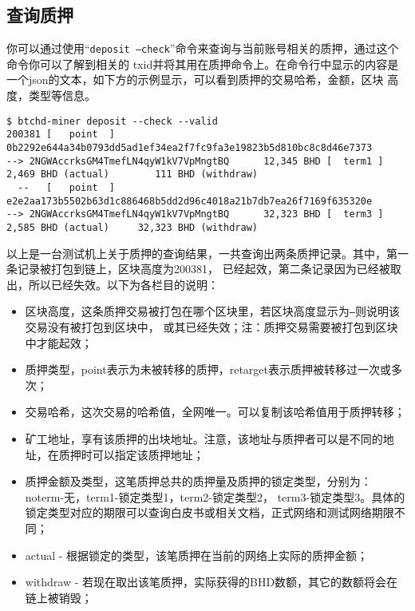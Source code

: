 \begin{flushleft}
\subsection{查询质押}
\begin{flushleft}
    你可以通过使用``\texttt{deposit --check}''命令来查询与当前账号相关的质押，通过这个命令你可以了解到相关的
    txid并将其用在质押命令上。在命令行中显示的内容是一个json的文本，如下方的示例显示，可以看到质押的交易哈希，金额，区块
    高度，类型等信息。
\end{flushleft}
\scriptsize
\begin{verbatim}
$ btchd-miner deposit --check --valid
200381 [   point  ] 0b2292e644a34b0793dd5ad1ef34ea2f7fc9fa3e19823b5d810bc8c8d46e7373
--> 2NGWAccrksGM4TmefLN4qyW1kV7VpMngtBQ      12,345 BHD [  term1 ]
2,469 BHD (actual)        111 BHD (withdraw)
  --   [   point  ] e2e2aa173b5502b63d1c886468b5dd2d96c4018a21b7db7ea26f7169f635320e
--> 2NGWAccrksGM4TmefLN4qyW1kV7VpMngtBQ      32,323 BHD [  term3 ]
2,585 BHD (actual)     32,323 BHD (withdraw)
\end{verbatim}
\normalsize
\begin{flushleft}
    以上是一台测试机上关于质押的查询结果，一共查询出两条质押记录。其中，第一条记录被打包到链上，区块高度为200381，
    已经起效，第二条记录因为已经被取出，所以已经失效。以下为各栏目的说明：
\end{flushleft}
\begin{itemize}
    \item 区块高度，这条质押交易被打包在哪个区块里，若区块高度显示为\texttt{---}则说明该交易没有被打包到区块中，
        或其已经失效；注：质押交易需要被打包到区块中才能起效；
    \item 质押类型，point表示为未被转移的质押，retarget表示质押被转移过一次或多次；
    \item 交易哈希，这次交易的哈希值，全网唯一。可以复制该哈希值用于质押转移；
    \item 矿工地址，享有该质押的出块地址。注意，该地址与质押者可以是不同的地址，在质押时可以指定该质押地址；
    \item 质押金额及类型，这笔质押总共的质押量及质押的锁定类型，分别为：noterm-无，term1-锁定类型1，term2-锁定类型2，
        term3-锁定类型3。具体的锁定类型对应的期限可以查询白皮书或相关文档，正式网络和测试网络期限不同；
    \item actual - 根据锁定的类型，该笔质押在当前的网络上实际的质押金额；
    \item withdraw - 若现在取出该笔质押，实际获得的BHD数额，其它的数额将会在链上被销毁；
\end{itemize}

\end{flushleft}

